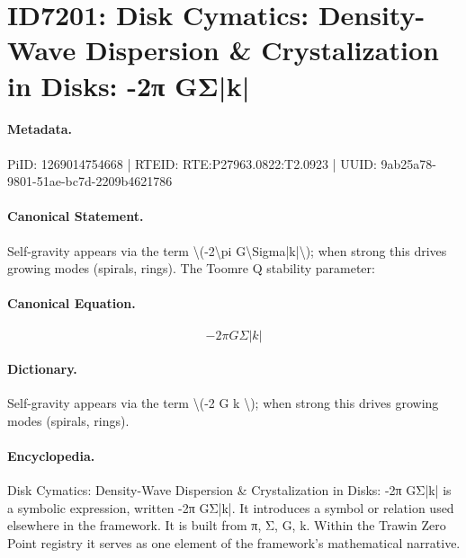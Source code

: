 \section*{ID7201: Disk Cymatics: Density-Wave Dispersion \& Crystalization in Disks: -2π GΣ|k|}
\paragraph{Metadata.}
PiID: 1269014754668 | RTEID: RTE:P27963.0822:T2.0923 | UUID: 9ab25a78-9801-51ae-bc7d-2209b4621786

\paragraph{Canonical Statement.}
Self-gravity appears via the term \textbackslash{}(-2\textbackslash{}pi G\textbackslash{}Sigma|k|\textbackslash{}); when strong this drives growing modes (spirals, rings). The Toomre Q stability parameter:

\paragraph{Canonical Equation.}
\[
-2\pi G\Sigma|k|
\]

\paragraph{Dictionary.}
Self-gravity appears via the term \textbackslash{}(-2 G k \textbackslash{}); when strong this drives growing modes (spirals, rings).

\paragraph{Encyclopedia.}
Disk Cymatics: Density-Wave Dispersion \& Crystalization in Disks: -2π GΣ|k| is a symbolic expression, written -2π GΣ|k|. It introduces a symbol or relation used elsewhere in the framework. It is built from π, Σ, G, k. Within the Trawin Zero Point registry it serves as one element of the framework's mathematical narrative.

